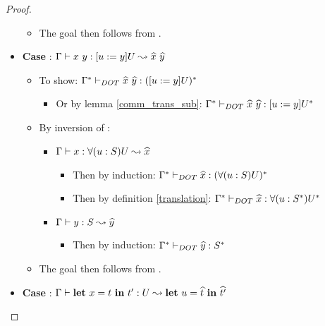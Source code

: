 \begin{proof}
\begin{itemize}
\begin{itemize}
\begin{itemize}
            \end{itemize}
            \item The goal then follows from .
        \end{itemize}
        \item \textbf{Case} :
            $$
        \begin{itemize}
            \item To show:
                $$
            \begin{itemize}
                \item Or by lemma \ref{comm_trans_sub}: $\TJT{\TRANS{\Gamma}}
                    {\ }{}$
            \end{itemize}
            \item By inversion of :
            \begin{itemize}
                \item $$
                \begin{itemize}
                    \item Then by induction: $\TJT{\TRANS{\Gamma}}
                        {}{}$
                    \item Then by definition \ref{translation}:
                        $
                        {}$
                \end{itemize}
                \item $$
                \begin{itemize}
                    \item Then by induction:
                        $$
                \end{itemize}
            \end{itemize}
            \item The goal then follows from .
        \end{itemize}
        \item \textbf{Case} :
            $$
        \begin{itemize}

\end{itemize}
\end{itemize}
\end{proof}
